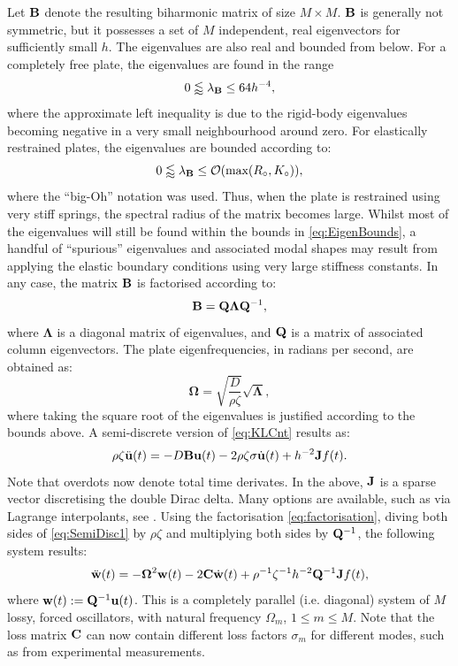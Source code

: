 Let $\bf B$ denote the resulting biharmonic matrix of size $M \times M$. $\bf B$ is generally not symmetric, but it possesses a set of $M$ independent, real eigenvectors for sufficiently small $h$. The eigenvalues are also real and bounded from below. For a completely free plate, the eigenvalues are found in the range
\begin{equation}\label{eq:EigenBounds}
0  \lessapprox \lambda_{\bf B} \leq 64 h^{-4},
\end{equation}
where the approximate left inequality is due to the rigid-body eigenvalues becoming negative in a very small neighbourhood around zero. For elastically restrained plates, the eigenvalues are bounded according to:
\begin{equation}
0 \lessapprox \lambda_{\bf B} \leq \mathcal{O}(\text{max}(R_\circ,K_\circ)), 
\end{equation}
where the ``big-Oh'' notation was used. Thus, when the plate is restrained using very stiff springs, the spectral radius of the matrix becomes large. Whilst most of the eigenvalues will still be found within the bounds in \eqref{eq:EigenBounds}, a handful of ``spurious'' eigenvalues and associated modal shapes may result from applying the elastic boundary conditions using very large stiffness constants. In any case, the matrix $\bf B$ is factorised according to:
\begin{equation}\label{eq:factorisation}
{\bf B} = {\bf Q}{\boldsymbol \Lambda}{\bf Q}^{-1},
\end{equation}
where ${\boldsymbol \Lambda}$ is a diagonal matrix of eigenvalues, and $\bf Q$ is a matrix of associated column eigenvectors. The plate eigenfrequencies, in radians per second, are obtained as:
\begin{equation}
{\boldsymbol \Omega} = \sqrt{\frac{D}{\rho\zeta}} \sqrt{{\boldsymbol \Lambda}},
\end{equation}
where taking the square root of the eigenvalues is justified according to the bounds above. A semi-discrete version of \eqref{eq:KLCnt} results as:
\begin{equation}\label{eq:SemiDisc1}
\rho \zeta \ddot {\bf u}(t) = -D{\bf B}{\bf u}(t) - 2\rho\zeta\sigma\dot {\bf u}(t) + h^{-2}{\bf J} f(t).
\end{equation}
Note that overdots now denote total time derivates. In the above, $\bf J$ is a sparse vector discretising the double Dirac delta. Many options are available, such as via Lagrange interpolants, see \cite{bilbao_numerical_2009}. Using the factorisation \eqref{eq:factorisation}, diving both sides of \eqref{eq:SemiDisc1} by $\rho \zeta$ and multiplying both sides by ${\bf Q}^{-1}$, the following system results:
\begin{equation}\label{eq:ModalSyst}
\ddot {\bf w}(t) = -{\boldsymbol \Omega}^2 {\bf w}(t) -2 {\bf C}\dot {\bf w}(t) + \rho^{-1}\zeta^{-1}h^{-2}{\bf Q}^{-1}{\bf J}f(t),
\end{equation}
where ${\bf w}(t) := {\bf Q}^{-1}{\bf u}(t)$. This is a completely parallel (i.e. diagonal) system of $M$ lossy, forced oscillators, with natural frequency $\Omega_m$, $1\leq m\leq M$. Note that the loss matrix $\bf C$ can now contain different loss factors $\sigma_m$ for different modes, such as from experimental measurements.  


